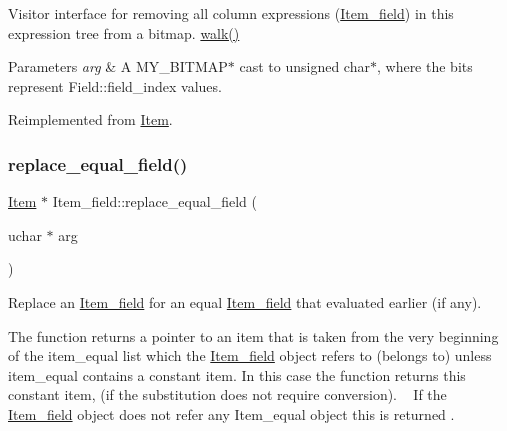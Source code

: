 Visitor interface for removing all column expressions (\mbox{\hyperlink{classItem__field}{Item\+\_\+field}}) in this expression tree from a bitmap.  \mbox{\hyperlink{classItem__ident_ab74fffc591821c7bc35929085ad82cf9}{walk()}}


\begin{DoxyParams}{Parameters}
{\em arg} & A M\+Y\+\_\+\+B\+I\+T\+M\+A\+P$\ast$ cast to unsigned char$\ast$, where the bits represent Field\+::field\+\_\+index values. \\
\hline
\end{DoxyParams}


Reimplemented from \mbox{\hyperlink{classItem_a46a9fb3471a7a0b846ce9487dce470b2}{Item}}.

\mbox{\label{classItem__field_a35bd6ec29eb603e59823a3c42d67673c}} 
\subsubsection{\texorpdfstring{replace\+\_\+equal\+\_\+field()}{replace\_equal\_field()}}
{\footnotesize\ttfamily \mbox{\hyperlink{classItem}{Item}} $\ast$ Item\+\_\+field\+::replace\+\_\+equal\+\_\+field (\begin{DoxyParamCaption}\item[{uchar $\ast$}]{arg }\end{DoxyParamCaption})\hspace{0.3cm}{\ttfamily [virtual]}}

Replace an \mbox{\hyperlink{classItem__field}{Item\+\_\+field}} for an equal \mbox{\hyperlink{classItem__field}{Item\+\_\+field}} that evaluated earlier (if any).

The function returns a pointer to an item that is taken from the very beginning of the item\+\_\+equal list which the \mbox{\hyperlink{classItem__field}{Item\+\_\+field}} object refers to (belongs to) unless item\+\_\+equal contains a constant item. In this case the function returns this constant item, (if the substitution does not require conversion). ~\newline
If the \mbox{\hyperlink{classItem__field}{Item\+\_\+field}} object does not refer any Item\+\_\+equal object \textquotesingle{}this\textquotesingle{} is returned .


